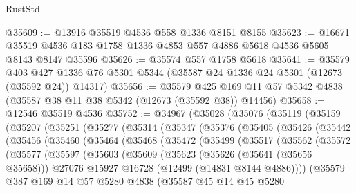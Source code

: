 \begin{lexlean}{RustStd}
\begin{coremodule}
@35609 := @13916 @35519 @4536 @558 @1336 @8151 @8155
@35623 := @16671 @35519 @4536 @183 @1758 @1336 @4853 @557 @4886 @5618 @4536 @5605 @8143 @8147 @35596
@35626 := @35574 @557 @1758 @5618
@35641 := @35579
    @403
    @427
    @1336
    @76
    @5301
    @5344
    (@35587 @24 @1336 @24 @5301 (@12673 (@35592 @24)) @14317)
@35656 := @35579
    @425
    @169
    @11
    @57
    @5342
    @4838
    (@35587 @38 @11 @38 @5342 (@12673 (@35592 @38)) @14456)
@35658 := @12546 @35519 @4536
@35752 := @34967
    (@35028
      (@35076
        (@35119
          (@35159
            (@35207
              (@35251
                (@35277
                  (@35314
                    (@35347
                      (@35376
                        (@35405
                          (@35426
                            (@35442
                              (@35456
                                (@35460
                                  (@35464
                                    (@35468
                                      (@35472
                                        (@35499
                                          (@35517
                                            (@35562
                                              (@35572
                                                (@35577
                                                  (@35597
                                                    (@35603
                                                      (@35609
                                                        (@35623
                                                          (@35626 (@35641 (@35656 @35658)))
                                                          @27076
                                                          @15927
                                                          @16728
                                                          (@12499 (@14831 @8144 @4886))))
                                                      (@35579
                                                        @387
                                                        @169
                                                        @14
                                                        @57
                                                        @5280
                                                        @4838
                                                        (@35587
                                                          @45
                                                          @14
                                                          @45
                                                          @5280

\end{coremodule}
\end{lexlean}
